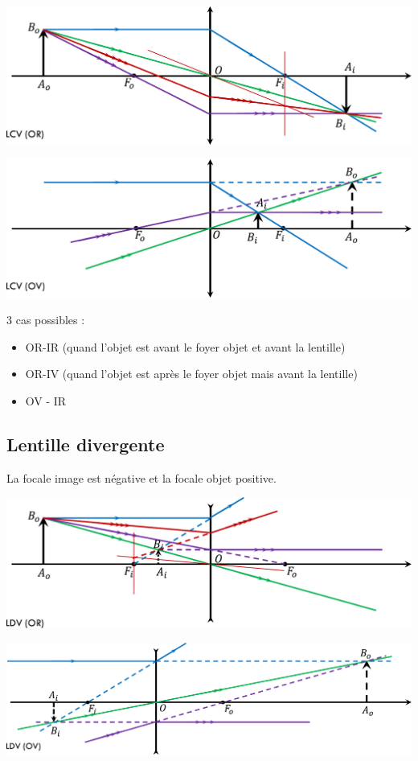 \documentclass[french]{yLectureNote}
\begin{document}
\includegraphics[scale=0.5]{cv-or}

\includegraphics[scale=0.5]{cv-ov}

3 cas possibles :
\begin{itemize}
 \item OR-IR (quand l'objet est avant le foyer objet et avant la lentille)
 \item OR-IV (quand l'objet est après le foyer objet mais avant la lentille)
 \item OV - IR
\end{itemize}

\subsection{Lentille divergente}
La focale image est négative et la focale objet positive.

\includegraphics[scale=0.5]{dv-or}

\includegraphics[scale=0.5]{dv-ov}
\end{document}
